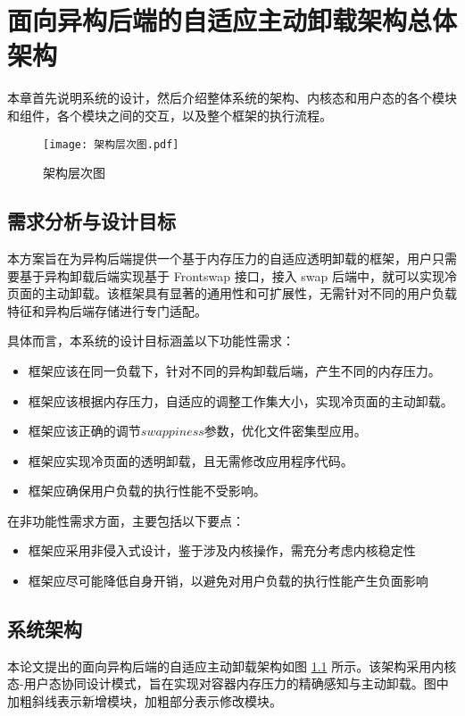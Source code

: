 \chapter{面向异构后端的自适应主动卸载架构总体架构}

本章首先说明系统的设计，然后介绍整体系统的架构、内核态和用户态的各个模块和组件，各个模块之间的交互，以及整个框架的执行流程。

\begin{figure}[htb]
    \centering
    \texttt{[image: 架构层次图.pdf]}
    \caption{架构层次图}
    \label{fig:system_architecture_hierarchy}
\end{figure}

\section{需求分析与设计目标}

本方案旨在为异构后端提供一个基于内存压力的自适应透明卸载的框架，用户只需要基于异构卸载后端实现基于 Frontswap 接口，接入 swap 后端中，就可以实现冷页面的主动卸载。该框架具有显著的通用性和可扩展性，无需针对不同的用户负载特征和异构后端存储进行专门适配。


具体而言，本系统的设计目标涵盖以下功能性需求：
\begin{itemize}
\item 框架应该在同一负载下，针对不同的异构卸载后端，产生不同的内存压力。
\item 框架应该根据内存压力，自适应的调整工作集大小，实现冷页面的主动卸载。
\item 框架应该正确的调节\(swappiness\)参数，优化文件密集型应用。
\item 框架应实现冷页面的透明卸载，且无需修改应用程序代码。
\item 框架应确保用户负载的执行性能不受影响。
\end{itemize}

在非功能性需求方面，主要包括以下要点：
\begin{itemize}
\item 框架应采用非侵入式设计，鉴于涉及内核操作，需充分考虑内核稳定性
\item 框架应尽可能降低自身开销，以避免对用户负载的执行性能产生负面影响
\end{itemize}

\section{系统架构}
本论文提出的面向异构后端的自适应主动卸载架构如图 \ref{fig:system_architecture_hierarchy} 所示。该架构采用内核态-用户态协同设计模式，旨在实现对容器内存压力的精确感知与主动卸载。图中加粗斜线表示新增模块，加粗部分表示修改模块。

